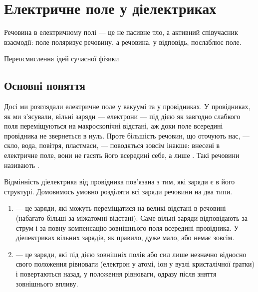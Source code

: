 
\chapter{Електричне поле у діелектриках}\label{\currfilebase}
\graphicspath{{\currfilebase/Pictures}}
\epigraph{Речовина в електричному полі --- це не пасивне тло, а активний співучасник взаємодії: поле поляризує речовину, а речовина, у відповідь,
	послаблює поле.
}{Переосмислення ідей сучасної фізики}


\section{Основні поняття}

Досі ми розглядали електричне поле у вакуумі та у провідниках. У провідниках, як ми з'ясували, вільні заряди --- електрони --- під дією як завгодно
слабкого поля переміщуються на макроскопічні відстані, аж доки поле всередині провідника не звернеться в нуль. Проте більшість речовин, що оточують
нас, --- скло, вода, повітря, пластмаси, --- поводяться зовсім інакше: внесені в електричне поле, вони не гасять його всередині себе, а лише
. Такі речовини називають .

Відмінність діелектрика від провідника пов'язана з тим, які заряди є в його структурі. Домовимось умовно розділяти всі заряди речовини на два типи.

\begin{enumerate}
	\item {} --- це заряди, які можуть переміщатися на великі відстані в речовині (набагато більші за міжатомні відстані). Саме
	      вільні заряди відповідають за струм і за повну компенсацію зовнішнього поля всередині провідника. У діелектриках вільних зарядів, як
	      правило, дуже мало, або немає зовсім.
	\item {} --- це заряди, які під дією зовнішніх полів або сил лише незначно  відносно
	      свого положення рівноваги (електрон у атомі, іон у вузлі кристалічної ґратки) і повертаються назад, у положення рівноваги, одразу після
	      зняття зовнішнього впливу.
\end{enumerate}

